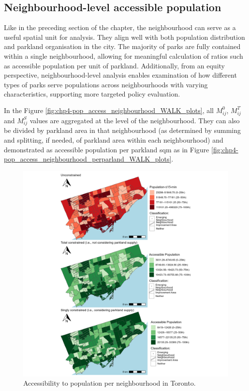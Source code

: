 \documentclass[
11pt, %
oneside, %
english, %
singlespacing, %
]{macthesis} %
\begin{document}
\subsection{Neighbourhood-level accessible population}\label{neighbourhood-level-accessible-population}

Like in the preceding section of the chapter, the neighbourhood can serve as a useful spatial unit for analysis. They align well with both population distribution and parkland organisation in the city. The majority of parks are fully contained within a single neighbourhood, allowing for meaningful calculation of ratios such as accessible population per unit of parkland. Additionally, from an equity perspective, neighbourhood-level analysis enables examination of how different types of parks serve populations across neighbourhoods with varying characteristics, supporting more targeted policy evaluation.

In the Figure \ref{fig:chp4-pop_access_neighbourhood_WALK_plots}, all \(M^0_{ij}\), \(M^T_{ij}\) and \(M^S_{ij}\) values are aggregated at the level of the neighbourhood. They can also be divided by parkland area in that neighbourhood (as determined by summing and splitting, if needed, of parkland area within each neighbourhood) and demonstrated as accessible population per parkland sqm as in Figure \ref{fig:chp4-pop_access_neighbourhood_perparland_WALK_plots}.

\begin{figure}

{\centering \includegraphics[width=6in]{./data/figures/chp4-pop_access_neighbourhood_WALK_plots} 

}

\caption{\label{fig:chp4-pop_access_neighbourhood_WALK_plots}Accessibility to population per neighbourhood in Toronto.}\label{fig:unnamed-chunk-69}
\end{figure}
\end{document}
